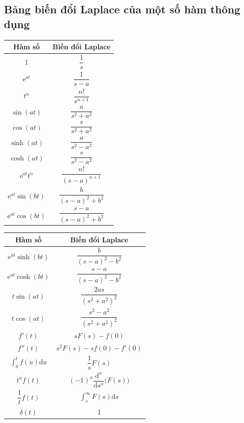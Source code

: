 \documentclass[10pt, a4paper]{article}
\begin{document}
	\subsection{Bảng biến đổi Laplace của một số hàm thông dụng}
	\begin{multicols}{2}
		\begin{center}
			\renewcommand{\arraystretch}{2.0}
			\begin{tabular}{|c|c|}
				\hline
				\textbf{\color{red}Hàm số} & \textbf{\color{red}Biến đổi Laplace} \\ \hline 
				1 & $\dfrac1s$ \\[4pt] \hline 
				$\mathrm e^{at}$ & $\dfrac{1}{s-a}$ \\[4pt] \hline 
				$t^n$ & $\dfrac{n!}{s^{n+1}}$ \\[4pt] \hline
				$\sin(at)$ & $\dfrac{a}{s^2+a^2}$ \\[4pt] \hline 
				$\cos(at)$ & $\dfrac{s}{s^2+a^2}$ \\[4pt] \hline
				$\sinh(at)$ & $\dfrac{a}{s^2-a^2}$ \\[4pt] \hline 
				$\cosh(at)$ & $\dfrac{s}{s^2-a^2}$ \\[4pt] \hline
				$\mathrm e^{at}t^n$ & $\dfrac{n!}{(s-a)^{n+1}}$ \\[4pt] \hline
				$\mathrm e^{at}\sin(bt)$ & $\dfrac{b}{(s-a)^2+b^2}$ \\[4pt] \hline 
				$\mathrm e^{at}\cos(bt)$ & $\dfrac{s-a}{(s-a)^2+b^2}$ \\[4pt] \hline
			\end{tabular}
		\end{center}
		\columnbreak
		\begin{center}
			\renewcommand{\arraystretch}{2.0}
			\begin{tabular}{|c|c|}
				\hline
				\textbf{\color{red}Hàm số} & \textbf{\color{red}Biến đổi Laplace} \\ \hline 
				$\mathrm e^{at}\sinh(bt)$ & $\dfrac{b}{(s-a)^2-b^2}$ \\[4pt] \hline 
				$\mathrm e^{at}\cosh(bt)$ & $\dfrac{s-a}{(s-a)^2-b^2}$ \\[4pt] \hline
				$t\sin(at)$ & $\dfrac{2as}{(s^2+a^2)^2}$ \\[4pt] \hline 
				$t\cos(at)$ & $\dfrac{s^2-a^2}{(s^2+a^2)^2}$ \\[4pt] \hline
				$f'(t)$ & $sF(s)-f(0)$ \\[4pt] \hline 
				$f''(t)$ & $s^2F(s)-sf(0)-f'(0)$ \\[4pt] \hline
				$\displaystyle\int_0^tf(u)\text{d}u$ & $\dfrac1sF(s)$ \\[4pt] \hline 
				$t^nf(t)$ & $(-1)^n\dfrac{\text{d}^n}{\text{d}s^n}\big(F(s)\big)$ \\[4pt] \hline
				$\dfrac1tf(t)$ & $\displaystyle\int_s^\infty F(s)\text{d}s$ \\[4pt] \hline 
				$\delta(t)$ & 1 \\[4pt] \hline
			\end{tabular}
		\end{center}
	\end{multicols}
\end{document}
